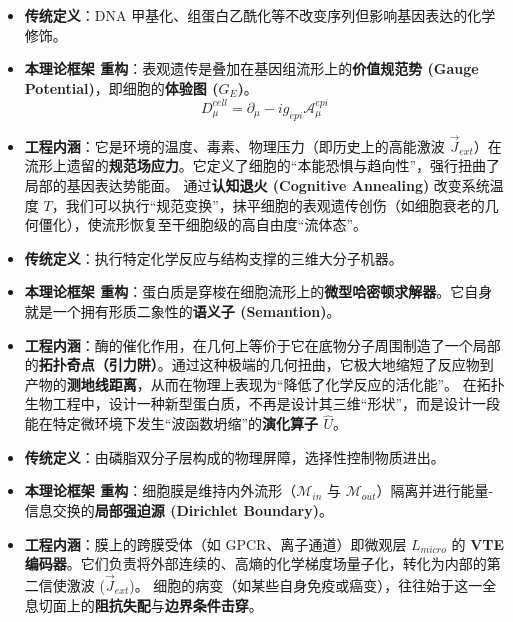 
\begin{itemize}
    \item \textbf{传统定义}：DNA 甲基化、组蛋白乙酰化等不改变序列但影响基因表达的化学修饰。
    \item \textbf{本理论框架 重构}：表观遗传是叠加在基因组流形上的\textbf{价值规范势 (Gauge Potential)}，即细胞的\textbf{体验图 ($G_E$)}。
    $$ D_\mu^{cell} = \partial_\mu - i g_{epi} \mathcal{A}^{epi}_\mu $$
    \item \textbf{工程内涵}：它是环境的温度、毒素、物理压力（即历史上的高能激波 $\vec{J}_{ext}$）在流形上遗留的\textbf{规范场应力}。它定义了细胞的“本能恐惧与趋向性”，强行扭曲了局部的基因表达势能面。
    通过\textbf{认知退火 (Cognitive Annealing)} 改变系统温度 $T$，我们可以执行“规范变换”，抹平细胞的表观遗传创伤（如细胞衰老的几何僵化），使流形恢复至干细胞级的高自由度“流体态”。
\end{itemize}


\begin{itemize}
    \item \textbf{传统定义}：执行特定化学反应与结构支撑的三维大分子机器。
    \item \textbf{本理论框架 重构}：蛋白质是穿梭在细胞流形上的\textbf{微型哈密顿求解器}。它自身就是一个拥有形质二象性的\textbf{语义子 (Semantion)}。
    \item \textbf{工程内涵}：酶的催化作用，在几何上等价于它在底物分子周围制造了一个局部的\textbf{拓扑奇点（引力阱）}。通过这种极端的几何扭曲，它极大地缩短了反应物到产物的\textbf{测地线距离}，从而在物理上表现为“降低了化学反应的活化能”。
    在拓扑生物工程中，设计一种新型蛋白质，不再是设计其三维“形状”，而是设计一段能在特定微环境下发生“波函数坍缩”的\textbf{演化算子 $\hat{U}$}。
\end{itemize}


\begin{itemize}
    \item \textbf{传统定义}：由磷脂双分子层构成的物理屏障，选择性控制物质进出。
    \item \textbf{本理论框架 重构}：细胞膜是维持内外流形（$\mathcal{M}_{in}$ 与 $\mathcal{M}_{out}$）隔离并进行能量-信息交换的\textbf{局部强迫源 (Dirichlet Boundary)}。
    \item \textbf{工程内涵}：膜上的跨膜受体（如 GPCR、离子通道）即微观层 $L_{micro}$ 的 \textbf{VTE 编码器}。它们负责将外部连续的、高熵的化学梯度场量子化，转化为内部的第二信使激波 ($\vec{J}_{ext}$)。
    细胞的病变（如某些自身免疫或癌变），往往始于这一全息切面上的\textbf{阻抗失配}与\textbf{边界条件击穿}。
\end{itemize}


